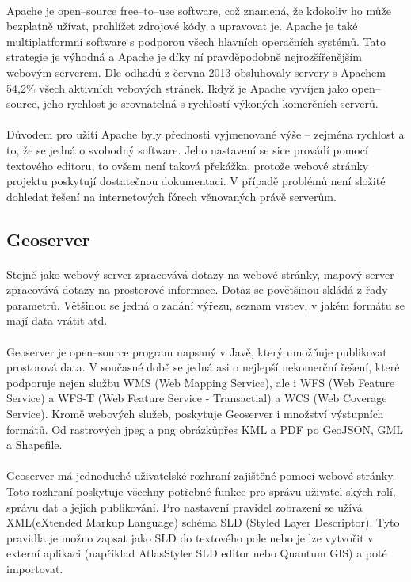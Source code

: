 \documentclass[11pt,a4paper,titlepage,oneside]{book}
\begin{document}
			\paragraph{} Apache je open--source free--to--use software, což znamená, že kdokoliv ho může bezplatně užívat, prohlížet zdrojové kódy a upravovat je. Apache je také multiplatformní software s podporou všech hlavních operačních systémů. Tato strategie je výhodná a Apache je díky ní pravděpodobně nejrozšířenějším webovým serverem. Dle odhadů z června 2013 obsluhovaly servery s Apachem  54,2\% všech aktivních vebových stránek\cite{wiki-Apache}. Ikdyž je Apache vyvíjen jako open--source, jeho rychlost je srovnatelná s rychlostí výkoných komerčních serverů. 
			\paragraph{} Důvodem pro užití Apache byly přednosti vyjmenované výše -- zejména rychlost a to, že se jedná o svobodný software. Jeho nastavení se sice provádí pomocí textového editoru, to ovšem není taková překážka, protože webové stránky projektu poskytují dostatečnou dokumentaci. V případě problémů není složité dohledat řešení na internetových fórech věnovaných právě serverům.

		\subsection{Geoserver}
			\paragraph{} Stejně jako webový server zpracovává dotazy na webové stránky, mapový server zpracovává dotazy na prostorové informace. Dotaz se povětšinou skládá z řady parametrů. Většinou se jedná o zadání výřezu, seznam vrstev, v jakém formátu se mají data vrátit atd. 
			\paragraph{} Geoserver je open--source program napsaný v Javě, který umožňuje publikovat prostorová data. V současné době se jedná asi o nejlepší nekomerční řešení\cite{vorlicek}, které podporuje nejen službu WMS (Web Mapping Service), ale i WFS (Web Feature Service) a WFS-T (Web Feature Service - Transactial) a WCS (Web Coverage Service). Kromě webových služeb, poskytuje Geoserver i množství výstupních formátů. Od rastrových jpeg a png obrázkůpřes KML a PDF po GeoJSON, GML a Shapefile.
			\paragraph{} Geoserver má jednoduché uživatelské rozhraní zajištěné pomocí webové stránky. Toto rozhraní poskytuje všechny potřebné funkce pro správu uživatel-ských rolí, správu dat a jejich publikování. Pro nastavení pravidel zobrazení se užívá XML(eXtended Markup Language) schéma SLD (Styled Layer Descriptor). Tyto pravidla je možno zapsat jako SLD do textového pole nebo je lze vytvořit v externí aplikaci (například AtlasStyler SLD editor\cite{atlas} nebo Quantum GIS\cite{qgis}) a poté importovat.
\end{document}

